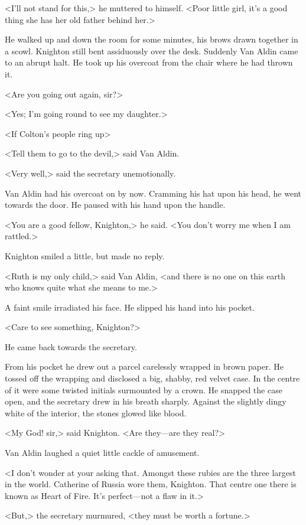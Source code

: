 <I'll not stand for this,> he muttered to himself. <Poor little girl, it's a good thing she has her old father behind her.>

He walked up and down the room for some minutes, his brows drawn together in a scowl. Knighton still bent assiduously over the desk. Suddenly Van Aldin came to an abrupt halt. He took up his overcoat from the chair where he had thrown it.

<Are you going out again, sir?>

<Yes; I'm going round to see my daughter.>

<If Colton's people ring up\longdash>

<Tell them to go to the devil,> said Van Aldin.

<Very well,> said the secretary unemotionally.

Van Aldin had his overcoat on by now. Cramming his hat upon his head, he went towards the door. He paused with his hand upon the handle.

<You are a good fellow, Knighton,> he said. <You don't worry me when I am rattled.>

Knighton smiled a little, but made no reply.

<Ruth is my only child,> said Van Aldin, <and there is no one on this earth who knows quite what she means to me.>

A faint smile irradiated his face. He slipped his hand into his pocket.

<Care to see something, Knighton?>

He came back towards the secretary.

From his pocket he drew out a parcel carelessly wrapped in brown paper. He tossed off the wrapping and disclosed a big, shabby, red velvet case. In the centre of it were some twisted initials surmounted by a crown. He snapped the case open, and the secretary drew in his breath sharply. Against the slightly dingy white of the interior, the stones glowed like blood.

<My God! sir,> said Knighton. <Are they—are they real?>

Van Aldin laughed a quiet little cackle of amusement.

<I don't wonder at your asking that. Amongst these rubies are the three largest in the world. Catherine of Russia wore them, Knighton. That centre one there is known as Heart of Fire. It's perfect—not a flaw in it.>

<But,> the secretary murmured, <they must be worth a fortune.>

